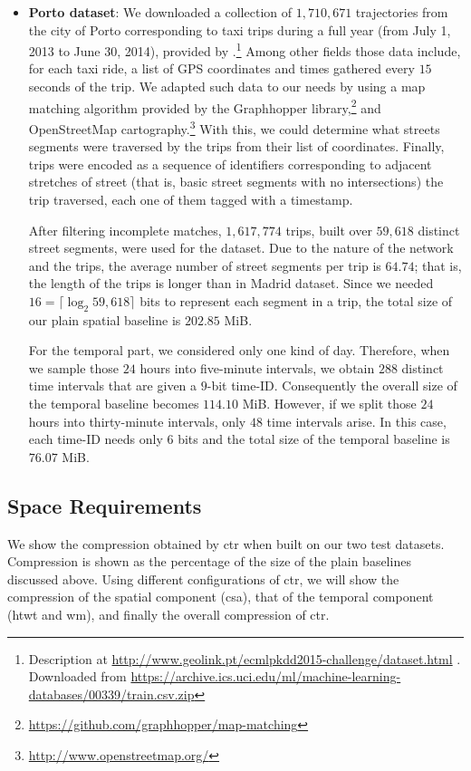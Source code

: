 \begin{itemize}
	\item \textbf{Porto dataset}:
		We downloaded a collection of $1,\!710,\!671 $ trajectories from the city of {Porto} corresponding to taxi trips during 
		a full year (from July 1, 2013 to June 30, 2014), provided by \cite{moreira2013predicting}.\footnote{Description at \url{http://www.geolink.pt/ecmlpkdd2015-challenge/dataset.html} . Downloaded from \url{https://archive.ics.uci.edu/ml/machine-learning-databases/00339/train.csv.zip}} Among other
		fields those data include, for each taxi ride, a list of GPS coordinates and times gathered every $15$ seconds of
		the trip. We adapted such data to our needs by using a map matching algorithm provided by the Graphhopper library,\footnote{\url{https://github.com/graphhopper/map-matching}}
		 and OpenStreetMap cartography.\footnote{\url{http://www.openstreetmap.org/}} With this, we could determine what streets segments were traversed by the trips from their list of coordinates. Finally, trips were encoded as a sequence of identifiers
	  corresponding to adjacent stretches of street (that is, basic street segments with no intersections) the trip traversed, each one of them tagged with a timestamp.
	  
	  After filtering incomplete matches, $1,\!617,\!774$ trips, built  over $59,\!618$ distinct street segments, were used for the dataset. 
	  Due to the nature of the network and the trips, 
	  the average number of street segments per trip is $64.74$; that is, the length of the trips is longer than in Madrid dataset.
	  Since we needed $16=\lceil\log_2 59,\!618 \rceil$ bits to represent each segment in a trip, the total size of our plain spatial baseline is $202.85$ MiB.

	  For the temporal part, we considered only one kind of day. Therefore, when we sample those $24$ hours into five-minute intervals,
	  we obtain $288$ distinct time intervals that are given a $9$-bit time-ID. Consequently the overall size of the temporal
	  baseline becomes $114.10$ MiB. However, if we split those $24$ hours into thirty-minute intervals, only $48$ time intervals 
	  arise. In this case, each time-ID needs only $6$ bits and the total size of the temporal baseline is $76.07$ MiB.
	\end{itemize}


	\subsection{Space Requirements}
	\label{sec:ctr:exp:space}
	We show the compression obtained by \gls{ctr} when built on our two test datasets. Compression is shown as the percentage of the size of the plain baselines discussed above.
	Using different configurations of \gls{ctr}, we will show the compression of the spatial component (\gls{csa}), 
	that of the temporal component (\gls{htwt} and \gls{wm}), and finally the overall compression of \gls{ctr}.

